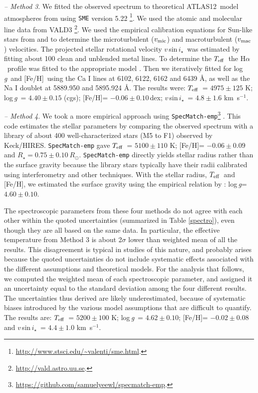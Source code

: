 \documentclass[twocolumn]{aastex61}
\newcommand{\attw}{{ATLAS12}}
\newcommand\halpha{H$\alpha$}
\newcommand\vsini{$v$\,sin\,$i_\star$}
\newcommand\vmic{$v_{\rm mic}$}
\newcommand\vmac{$v_{\rm mac}$}
\newcommand\teff{$T_{\rm eff}$}
\newcommand\logg{log\,{\it g}}
\newcommand\met{[Fe/H]}
\begin{document}
\emph{-- Method 3}. We fitted the observed spectrum to theoretical \attw\ model atmospheres from \cite{Kurucz2013} using {\tt SME} version 5.22 \citep{vp96,vf05,pv2017}\footnote{\url{http://www.stsci.edu/~valenti/sme.html}.}. We used the atomic and molecular line data from VALD3 \citep{pk1995,kp1999}\footnote{\url{http://vald.astro.uu.se}.}. We used the empirical calibration equations for Sun-like stars from \cite{Bruntt2010b} and \cite{Doyle2014} to determine the microturbulent (\vmic) and macroturbulent (\vmac) velocities. The projected stellar rotational velocity \vsini\ was estimated by fitting about 100 clean and unblended metal lines. To determine the \teff\, the \halpha\ profile was fitted to the appropriate model \citep{fuhrmann93,axer94,fuhrmann94,fuhr97a,fuhr97b}. Then we iteratively fitted for \logg\ and \met\ using the Ca I lines at 6102, 6122, 6162 and 6439 \AA, as well as the Na I doublet at 5889.950 and 5895.924 \AA. The results were: \teff\ = $4975 \pm 125$ K; \logg\ =  $4.40 \pm 0.15$ (cgs); \met =  $-0.06\pm 0.10$\,dex; \vsini\ =  $4.8 \pm 1.6$ km~s$^{-1}$.

\emph{-- Method 4}.  We took a more empirical approach using {\tt SpecMatch-emp}\footnote{\url{https://github.com/samuelyeewl/specmatch-emp}.} \citep{Yee2017}. This code estimates the stellar parameters by comparing the observed spectrum with a library of about 400 well-characterized stars (M5 to F1) observed by Keck/HIRES. {\tt SpecMatch-emp} gave \teff\ = $5100 \pm 110$ K; \met =  $-0.06\pm 0.09$ and $R_\star = 0.75 \pm 0.10~R_{\odot}$. {\tt SpecMatch-emp} directly yields stellar radius rather than the surface gravity because the library stars typically have their radii calibrated using interferometry and other techniques. With the stellar radius, \teff\ and \met, we estimated the surface gravity using the empirical relation by \citet{Torres2010}: \logg =  $4.60 \pm 0.10$.

The spectroscopic parameters from these four methods do not agree with each other within the quoted uncertainties (summarized in Table \ref{spectro}), even though they are all based on the same data. In particular, the effective temperature
from Method 3 is about 2$\sigma$ lower than weighted mean of all the results.
This disagreement is typical in studies of this nature, and probably
arises because the quoted uncertainties do not include systematic effects associated with the
different assumptions and theoretical models.
For the analysis that follows, we computed the weighted mean of each spectroscopic parameter,
and assigned it an uncertainty equal to the standard deviation among the four different results. The uncertainties thus derived are likely underestimated,
because of systematic biases introduced by the various model assumptions that are difficult to quantify.
The results are:
\teff\ = $5200 \pm 100$ K; \logg\ =  $4.62 \pm 0.10$; \met =  $-0.02\pm 0.08$ and \vsini\ =  $4.4 \pm 1.0$ km~s$^{-1}$. 
\end{document}
